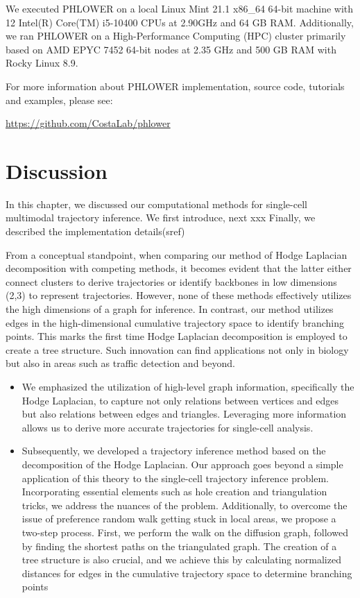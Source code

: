 We executed PHLOWER on a local Linux Mint 21.1 x86\_64 64-bit machine with 12 Intel(R) Core(TM) i5-10400 CPUs at 2.90GHz and 64 GB RAM. Additionally, we ran PHLOWER on a High-Performance Computing (HPC) cluster primarily based on AMD EPYC 7452 64-bit nodes at 2.35 GHz and 500 GB RAM with Rocky Linux 8.9.

For more information about PHLOWER implementation, source code, tutorials and examples, please see:
\begin{center}
\url{https://github.com/CostaLab/phlower}
\end{center}

\section{Discussion}
\label{TI_methods:discussion}
In this chapter, we discussed our computational methods for single-cell multimodal trajectory inference. We first introduce, next xxx
Finally, we described the implementation details(sref{})

From a conceptual standpoint, when comparing our method of Hodge Laplacian decomposition with competing methods, it becomes evident that the latter either connect clusters to derive trajectories or identify backbones in low dimensions (2,3) to represent trajectories. However, none of these methods effectively utilizes the high dimensions of a graph for inference. In contrast, our method utilizes edges in the high-dimensional cumulative trajectory space to identify branching points. This marks the first time Hodge Laplacian decomposition is employed to create a tree structure. Such innovation can find applications not only in biology but also in areas such as traffic detection and beyond.

\begin{itemize}

    \item We emphasized the utilization of high-level graph information, specifically the Hodge Laplacian, to capture not only relations between vertices and edges but also relations between edges and triangles. Leveraging more information allows us to derive more accurate trajectories for single-cell analysis.

    \item Subsequently, we developed a trajectory inference method based on the decomposition of the Hodge Laplacian. Our approach goes beyond a simple application of this theory to the single-cell trajectory inference problem. Incorporating essential elements such as hole creation and triangulation tricks, we address the nuances of the problem. Additionally, to overcome the issue of preference random walk getting stuck in local areas, we propose a two-step process. First, we perform the walk on the diffusion graph, followed by finding the shortest paths on the triangulated graph. The creation of a tree structure is also crucial, and we achieve this by calculating normalized distances for edges in the cumulative trajectory space to determine branching points

\end{itemize}


